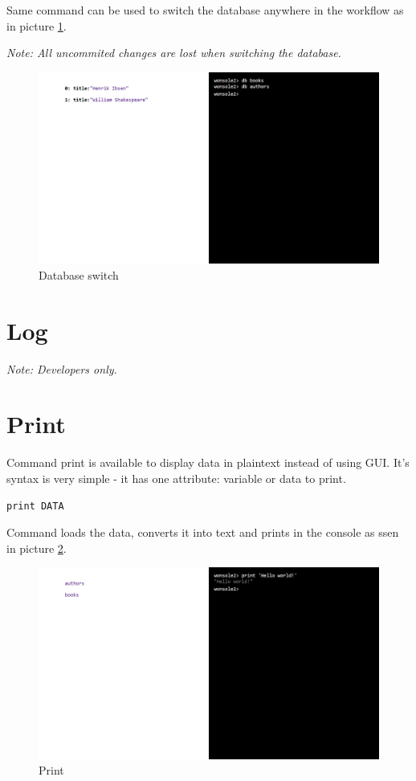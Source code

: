 \documentclass[10pt,a4paper,oneside]{report}
\begin{document}
Same command can be used to switch the database anywhere in the workflow as in
picture \ref{wonsole2-04}.

\textit{Note: All uncommited changes are lost when switching the database.}

\begin{figure}
\centering
\includegraphics[width=\textwidth]{screenshot/wonsole2/wonsole2-04.png}
\caption{Database switch}
\label{wonsole2-04}
\end{figure}

\section{Log}
\textit{Note: Developers only.}

\section{Print}
Command print is available to display data in plaintext instead of using GUI.
It's syntax is very simple - it has one attribute: variable or data to print.
\begin{verbatim}
print DATA
\end{verbatim}
Command loads the data, converts it into text and prints in the console as ssen
in picture \ref{wonsole2-10}.

\begin{figure}
\centering
\includegraphics[width=\textwidth]{screenshot/wonsole2/wonsole2-10.png}
\caption{Print}
\label{wonsole2-10}
\end{figure}
\end{document}
